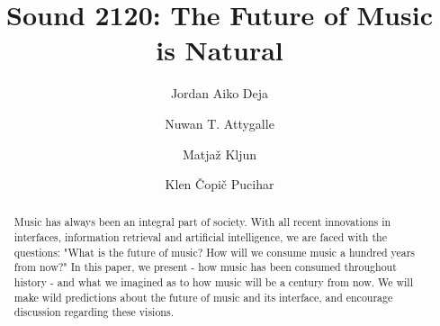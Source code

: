 \documentclass[acmtog]{acmart}
\begin{document}
\title{Sound 2120: The Future of Music is Natural}

\author{Jordan Aiko Deja}
\author{Nuwan T. Attygalle}
\authornotemark[1]

\author{Matjaž Kljun}
\author{Klen Čopič Pucihar}
\authornotemark[1]


\renewcommand{\shortauthors}{Deja and Attygalle, et. al. }

\begin{abstract}
  Music has always been an integral part of society. With all recent innovations in interfaces, information retrieval and artificial intelligence, we are faced with the questions: "What is the future of music? How will we consume music a hundred years from now?" In this paper, we present - how music has been consumed throughout history - and what we imagined as to how music will be a century from now. We will make wild predictions about the future of music and its interface, and encourage discussion regarding these visions. 
\end{abstract}
\end{document}
